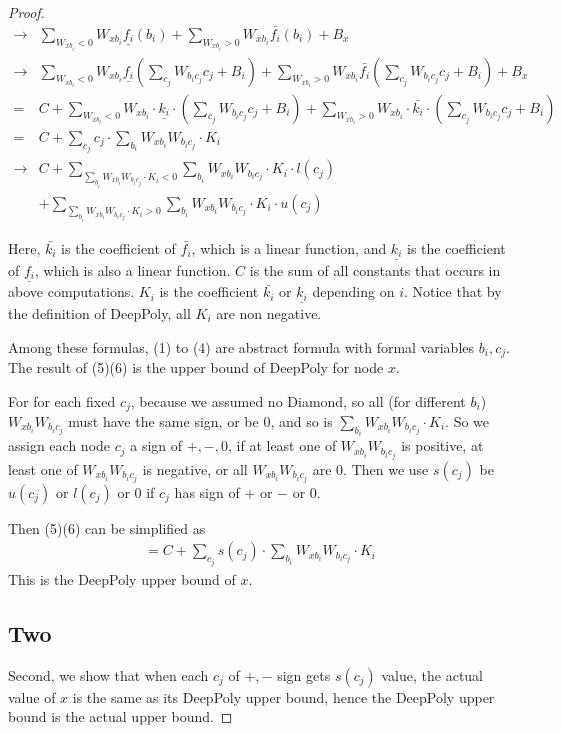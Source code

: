 \documentclass[]{article}
\theoremstyle{definition}
\begin{document}
\begin{proof}
\begin{align}
 \rightarrow&\sum_{W_{xb_i}<0}W_{xb_i}\underline{f_i}(b_i)+\sum_{W_{xb_i}>0}W_{xb_i}\bar{f_i}(b_i)+B_x\\
 \rightarrow&\sum_{W_{xb_i}<0}W_{xb_i}\underline{f_i}(\sum_{c_j}W_{b_ic_j}c_j+B_i)+\sum_{W_{xb_i}>0}W_{xb_i}\bar{f_i}(\sum_{c_j}W_{b_ic_j}c_j+B_i)+B_x\\
 =& C+\sum_{W_{xb_i}<0}W_{xb_i}\cdot\underline{k_i}\cdot(\sum_{c_j}W_{b_ic_j}c_j+B_i)+\sum_{W_{xb_i}>0}W_{xb_i}\cdot\bar{k_i}\cdot(\sum_{c_j}W_{b_ic_j}c_j+B_i)\\
 =& C+\sum_{c_j}c_j\cdot\sum_{b_i}W_{xb_i}W_{b_ic_j}\cdot K_i\\
 \rightarrow& C+\sum_{\sum_{b_i}W_{xb_i}W_{b_ic_j}\cdot K_i<0}\sum_{b_i}W_{xb_i}W_{b_ic_j}\cdot K_i\cdot l(c_j)\\
 &+\sum_{\sum_{b_i}W_{xb_i}W_{b_ic_j}\cdot K_i>0}\sum_{b_i}W_{xb_i}W_{b_ic_j}\cdot K_i\cdot u(c_j)
\end{align} 

Here, $\bar{k_i}$ is the coefficient of $\bar{f_i}$, which is a linear function, and $\underline{k_i}$ is the coefficient of $\underline{f_i}$, which is also a linear function. $C$ is the sum of all constants that occurs in above computations. $K_i$ is the coefficient $\bar{k_i}$ or $\underline{k_i}$ depending on $i$. Notice that by the definition of DeepPoly, all $K_i$ are non negative. 

Among these formulas, (1) to (4) are abstract formula with formal variables $b_i,c_j$. The result of (5)(6) is the upper bound of DeepPoly for node $x$. 

For for each fixed $c_j$, because we assumed no Diamond, so all (for different $b_i$) $W_{xb_i}W_{b_ic_j}$ must have the same sign, or be $0$, and so is $\sum_{b_i}W_{xb_i}W_{b_ic_j}\cdot K_i$. So we assign each node $c_j$ a sign of $+,-,0$,  if at least one of $W_{xb_i}W_{b_ic_j}$ is positive, at least one of $W_{xb_i}W_{b_ic_j}$ is negative, or all $W_{xb_i}W_{b_ic_j}$ are 0. Then we use $s(c_j)$ be $u(c_j)$ or $l(c_j)$ or $0$ if $c_j$ has sign of $+$ or $-$ or $0$.



Then (5)(6) can be simplified as \begin{align}
	=C+\sum_{c_j}s(c_j)\cdot\sum_{b_i}W_{xb_i}W_{b_ic_j}\cdot K_i
\end{align} This is the DeepPoly upper bound of $x$.

\subsection*{Two} Second, we show that when each $c_j$ of $+,-$ sign gets $s(c_j)$ value, the actual value of $x$ is the same as its DeepPoly upper bound, hence the DeepPoly upper bound is the actual upper bound.


\end{proof}
\end{document}
